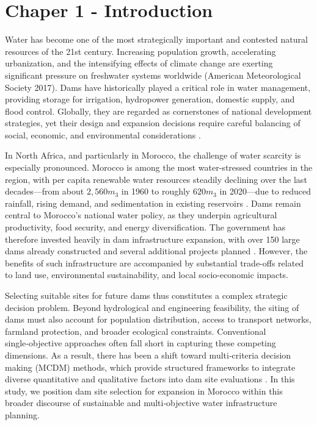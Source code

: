 \section{Chaper 1 - Introduction}\label{sec:introduction}
Water has become one of the most strategically important and contested natural resources of the 21st century. Increasing population growth, accelerating urbanization, and the intensifying effects of climate change are exerting significant pressure on freshwater systems worldwide (American Meteorological Society 2017)\cite{AMS2017}. Dams have historically played a critical role in water management, providing storage for irrigation, hydropower generation, domestic supply, and flood control. Globally, they are regarded as cornerstones of national development strategies, yet their design and expansion decisions require careful balancing of social, economic, and environmental considerations \cite{Schmitt2024,AMS2017}.

In North Africa, and particularly in Morocco, the challenge of water scarcity is especially pronounced. Morocco is among the most water-stressed countries in the region, with per capita renewable water resources steadily declining over the last decades—from about $2,560m_3$ in 1960 to roughly $620m_3$ in 2020—due to reduced rainfall, rising demand, and sedimentation in existing reservoirs \cite{WorldBank2023}. Dams remain central to Morocco’s national water policy, as they underpin agricultural productivity, food security, and energy diversification. The government has therefore invested heavily in dam infrastructure expansion, with over 150 large dams already constructed and several additional projects planned \cite{TradeGov2024}. However, the benefits of such infrastructure are accompanied by substantial trade-offs related to land use, environmental sustainability, and local socio-economic impacts.

Selecting suitable sites for future dams thus constitutes a complex strategic decision problem. Beyond hydrological and engineering feasibility, the siting of dams must also account for population distribution, access to transport networks, farmland protection, and broader ecological constraints. Conventional single‑objective approaches often fall short in capturing these competing dimensions. As a result, there has been a shift toward multi‑criteria decision making (MCDM) methods, which provide structured frameworks to integrate diverse quantitative and qualitative factors into dam site evaluations \cite{TradeGov2024,Minatour2015}. In this study, we position dam site selection  for expansion in Morocco within this broader discourse of sustainable and multi‑objective water infrastructure planning.

